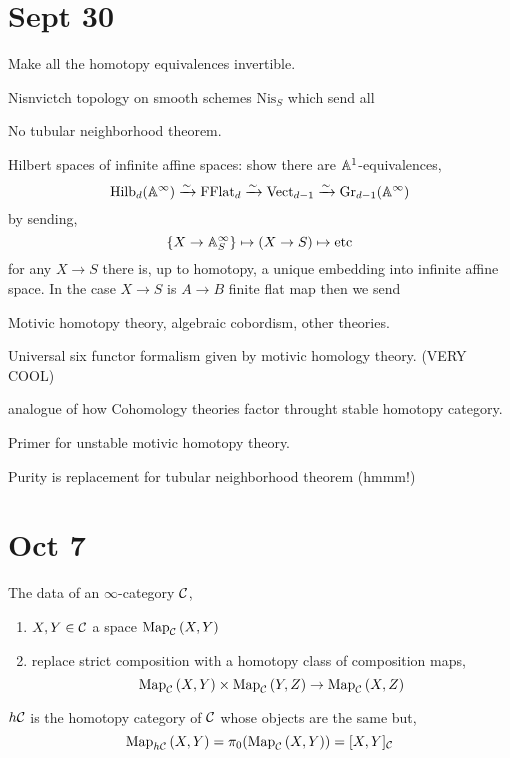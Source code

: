 \documentclass[12pt]{article}
\begin{document}
\section{Sept 30}

\newcommand{\Nis}{\mathrm{Nis}}

Make all the homotopy equivalences invertible.  


Nisnvictch topology on smooth schemes $\Nis_S$ which send all 


No tubular neighborhood theorem. 



Hilbert spaces of infinite affine spaces: show there are $\mathbb{A}^1$-equivalences,
\[ \mathrm{Hilb}_d(\mathbb{A}^{\infty}) \xrightarrow{\sim} \mathrm{FFlat}_d \xrightarrow{\sim} \mathrm{Vect}_{d-1} \xrightarrow{\sim} \mathrm{Gr}_{d-1}(\mathbb{A}^{\infty}) \]
by sending,
\[ \{ X \to \mathbb{A}^{\infty}_S \} \mapsto (X \to S) \mapsto \mathrm{etc} \]
for any $X \to S$ there is, up to homotopy, a unique embedding into infinite affine space. In the case $X \to S$ is $A \to B$ finite flat map then we send 


Motivic homotopy theory, algebraic cobordism, other theories. 

Universal six functor formalism given by motivic homology theory. (VERY COOL)

analogue of how Cohomology theories factor throught stable homotopy category.


Primer for unstable motivic homotopy theory.

Purity is replacement for tubular neighborhood theorem (hmmm!)

\section{Oct 7}

\newcommand{\Map}[3]{\mathrm{Map}_{#1}\left(#2, #3 \right)}
\newcommand{\Fun}[2]{\mathrm{Fun}\left( #1, #2 \right)}

The data of an $\infty$-category $\mathcal{C}$,
\begin{enumerate}
\item $X, Y \in \mathcal{C}$ a space $\Map{\C}{X}{Y}$
\item replace strict composition with a homotopy class of composition maps,
\[ \Map{\C}{X}{Y} \times \Map{\C}{Y}{Z} \to \Map{\C}{X}{Z} \]
\end{enumerate}

\begin{defn}
$h\mathcal{C}$ is the homotopy category of $\mathcal{C}$ whose objects are the same but,
\[ \Map{h\C}{X}{Y} = \pi_0(\Map{\C}{X}{Y}) = [X,Y]_{\C} \]
\end{defn}
\end{document}
